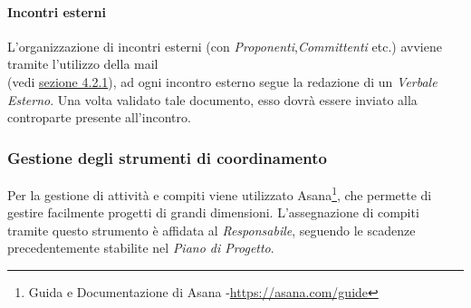 \paragraph{Incontri esterni}\label{Com esterne} L'organizzazione di incontri esterni (con \textit{Proponenti},\textit{Committenti} etc.) avviene tramite l'utilizzo della mail \\ \mailzeroseven (vedi \hyperref[Com esterne]{sezione 4.2.1}), ad ogni incontro esterno segue la redazione di un \textit{Verbale Esterno}. Una volta validato tale documento, esso dovrà essere inviato alla controparte presente all'incontro.

\subsubsection{Gestione degli strumenti di coordinamento} Per la gestione di attività e compiti viene utilizzato Asana\footnote{Guida e Documentazione di Asana -\url{https://asana.com/guide}}, che permette di gestire facilmente progetti di grandi dimensioni.
L'assegnazione di compiti tramite questo strumento è affidata al \textit{Responsabile}, seguendo le scadenze precedentemente stabilite nel \textit{Piano di Progetto}.
